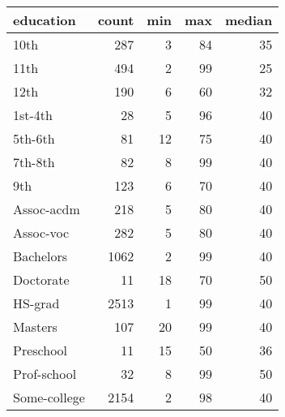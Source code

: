 \documentclass[]{article}
\newenvironment{Shaded}{\begin{snugshade}}{\end{snugshade}}
\newcommand{\DataTypeTok}[1]{\textcolor[rgb]{0.13,0.29,0.53}{#1}}
\newcommand{\DecValTok}[1]{\textcolor[rgb]{0.00,0.00,0.81}{#1}}
\newcommand{\KeywordTok}[1]{\textcolor[rgb]{0.13,0.29,0.53}{\textbf{#1}}}
\newcommand{\NormalTok}[1]{#1}
\newcommand{\OperatorTok}[1]{\textcolor[rgb]{0.81,0.36,0.00}{\textbf{#1}}}
\newcommand{\StringTok}[1]{\textcolor[rgb]{0.31,0.60,0.02}{#1}}
\begin{document}
\begin{Shaded}
\end{Shaded}

\begin{tabular}{l|r|r|r|r}
\hline
education & count & min & max & median\\
\hline
10th & 287 & 3 & 84 & 35\\
\hline
11th & 494 & 2 & 99 & 25\\
\hline
12th & 190 & 6 & 60 & 32\\
\hline
1st-4th & 28 & 5 & 96 & 40\\
\hline
5th-6th & 81 & 12 & 75 & 40\\
\hline
7th-8th & 82 & 8 & 99 & 40\\
\hline
9th & 123 & 6 & 70 & 40\\
\hline
Assoc-acdm & 218 & 5 & 80 & 40\\
\hline
Assoc-voc & 282 & 5 & 80 & 40\\
\hline
Bachelors & 1062 & 2 & 99 & 40\\
\hline
Doctorate & 11 & 18 & 70 & 50\\
\hline
HS-grad & 2513 & 1 & 99 & 40\\
\hline
Masters & 107 & 20 & 99 & 40\\
\hline
Preschool & 11 & 15 & 50 & 36\\
\hline
Prof-school & 32 & 8 & 99 & 50\\
\hline
Some-college & 2154 & 2 & 98 & 40\\
\hline
\end{tabular}
\end{document}
